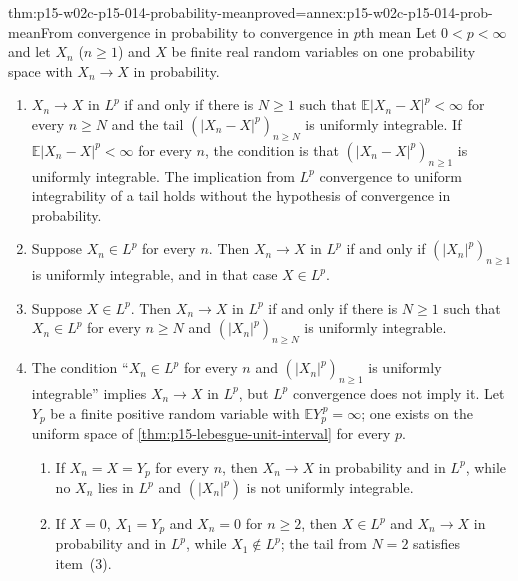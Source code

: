 \begin{hbtheorem}{thm:p15-w02c-p15-014-probability-mean}{proved=annex:p15-w02c-p15-014-prob-mean}{From convergence in probability to convergence in \(p\)th mean}
Let \(0<p<\infty\) and let \(X_n\) (\(n\geq1\)) and \(X\) be finite real
random variables on one probability space with \(X_n\to X\) in
probability.
\begin{enumerate}
\item \(X_n\to X\) in \(L^p\) if and only if there is \(N\geq1\) such
      that \(\mathbb E|X_n-X|^p<\infty\) for every \(n\geq N\) and the
      tail \((|X_n-X|^p)_{n\geq N}\) is uniformly integrable. If
      \(\mathbb E|X_n-X|^p<\infty\) for every \(n\), the condition is
      that \((|X_n-X|^p)_{n\geq1}\) is uniformly integrable. The
      implication from \(L^p\) convergence to uniform integrability of
      a tail holds without the hypothesis of convergence in probability.
\item Suppose \(X_n\in L^p\) for every \(n\). Then \(X_n\to X\) in
      \(L^p\) if and only if \((|X_n|^p)_{n\geq1}\) is uniformly
      integrable, and in that case \(X\in L^p\).
\item Suppose \(X\in L^p\). Then \(X_n\to X\) in \(L^p\) if and only if
      there is \(N\geq1\) such that \(X_n\in L^p\) for every \(n\geq N\)
      and \((|X_n|^p)_{n\geq N}\) is uniformly integrable.
\item The condition ``\(X_n\in L^p\) for every \(n\) and
      \((|X_n|^p)_{n\geq1}\) is uniformly integrable'' implies
      \(X_n\to X\) in \(L^p\), but \(L^p\) convergence does not imply it.
      Let \(Y_p\) be a finite positive random variable with
      \(\mathbb E Y_p^{\,p}=\infty\); one exists on the uniform space of
      \cref{thm:p15-lebesgue-unit-interval} for every \(p\).
      \begin{enumerate}
      \item If \(X_n=X=Y_p\) for every \(n\), then \(X_n\to X\) in
            probability and in \(L^p\), while no \(X_n\) lies in
            \(L^p\) and \((|X_n|^p)\) is not uniformly integrable.
      \item If \(X=0\), \(X_1=Y_p\) and \(X_n=0\) for \(n\geq2\), then
            \(X\in L^p\) and \(X_n\to X\) in probability and in
            \(L^p\), while \(X_1\notin L^p\); the tail from \(N=2\)
            satisfies item~(3).
      \end{enumerate}
\end{enumerate}
\end{hbtheorem}

